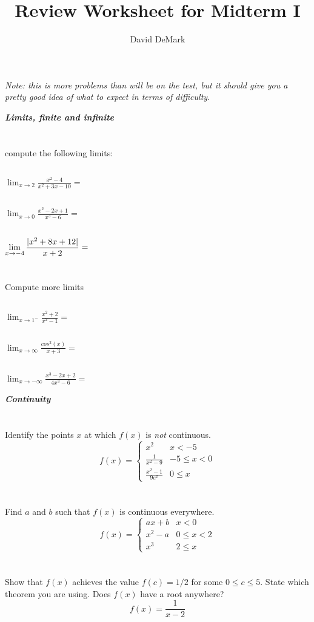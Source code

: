 \documentclass[english]{article}
\title{Review Worksheet for Midterm I}
\author{David DeMark}
\date{\due}
\DeclarePairedDelimiter\abs{\lvert}{\rvert}%
\newcommand{\prob}[1]{\setcounter{section}{#1-1}\section{}}
\newcommand{\prt}[1]{\setcounter{subsection}{#1-1}\subsection{}}
\theoremstyle{remark}
\theoremstyle{definition}
\begin{document}
	\maketitle
	\emph{Note: this is more problems than will be on the test, but it should give you a pretty good idea of what to expect in terms of difficulty.}
\begin{center}{\LARGE\textbf{\emph{Limits, finite and infinite}}}\end{center}
	\prob{1} compute the following limits:
	\prt{1} $\displaystyle{\lim_{x\to 2} \frac{x^2-4}{x^2+3x-10}=}$\vspace{4cm}
	\prt{2} $\displaystyle{\lim_{x\to 0} \frac{x^2-2x+1}{x^3-6}=}$\vspace{4cm}
	\prt{3} $\displaystyle{\lim_{x\to -4} \frac{\abs{x^2+8x+12}}{x+2}=}$\vspace{4cm}\newpage
	\prob{2} Compute more limits
	\prt{1} $\displaystyle{\lim_{x\to 1^-} \frac{x^2+2}{x^2-1}=}$\vspace{5cm}
	\prt{2}	$\displaystyle{\lim_{x\to \infty} \frac{cos^2(x)}{x+3}=}$\vspace{5cm}
	\prt{3} $\displaystyle{\lim_{x\to -\infty} \frac{x^3-2x+2}{4x^3-6}=}$\vspace{5cm}\newpage
	\begin{center}{\LARGE\textbf{\emph{Continuity}}}\end{center}
	\prob{3} Identify the points $x$ at which $f(x)$ is \emph{not} continuous.
	\begin{equation*} f(x)=\begin{cases}
x^2&x<-5\\
\frac{1}{x^2-9}&-5\leq x<0\\
\frac{x^2-1}{9e^x}& 0\leq x 
	\end{cases}
	\end{equation*}
	\vspace{4cm}
	\prob{4} Find $a$ and $b$ such that $f(x)$ is continuous everywhere.
	\begin{equation*}
	f(x)=\begin{cases}
	ax+b&x<0\\
	x^2-a &0\leq x <2\\
	x^3 & 2\leq x
	\end{cases}
	\end{equation*}\vspace{4.5cm}
	\prob{5} Show that $f(x)$ achieves the value $f(c)=1/2$ for some $0\leq c \leq 5$. State which theorem you are using. Does $f(x)$ have a root anywhere?
	$$f(x)=\frac{1}{x-2}$$\vspace{6cm}
\end{document}
